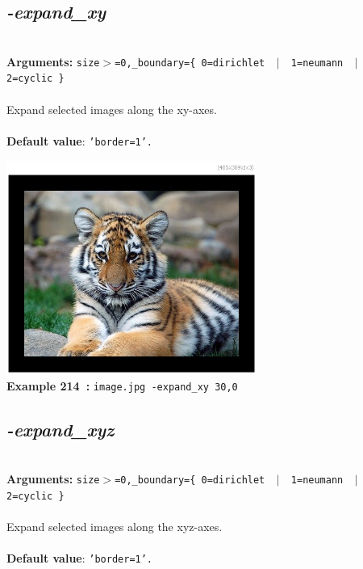 \documentclass[a4paper,11pt,twoside]{book}
\begin{document}
\subsection{\emph{-expand\_xy} }\vspace*{-0.5em}
~\\\textbf{Arguments: } 
{\small \texttt{size$>$=0,\_boundary=\{ 0=dirichlet ~$|$~ 1=neumann ~$|$~ 2=cyclic \}}}\\~\\
Expand selected images along the xy-axes.
~\\~\\\textbf{Default value}: {\small \texttt{'border=1'.}}
\begin{center}\includegraphics[keepaspectratio=true,height=7cm,width=\textwidth]{img/gmic_def214.jpg}\\
{\footnotesize \textbf{Example 214~:} \texttt{image.jpg -expand\_xy 30,0}}
\end{center}

\subsection{\emph{-expand\_xyz} }\vspace*{-0.5em}
~\\\textbf{Arguments: } 
{\small \texttt{size$>$=0,\_boundary=\{ 0=dirichlet ~$|$~ 1=neumann ~$|$~ 2=cyclic \}}}\\~\\
Expand selected images along the xyz-axes.
~\\~\\\textbf{Default value}: {\small \texttt{'border=1'.}}
\end{document}
